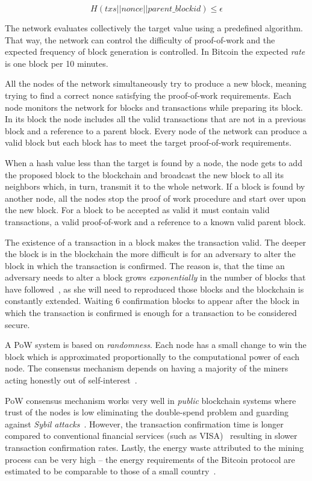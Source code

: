 \begin{equation*}
  H(txs || nonce || parent\_blockid) \leq \epsilon
\end{equation*}

The network evaluates collectively the target value using a predefined algorithm. That way, the network can control the difficulty of proof-of-work and the expected frequency of block generation is controlled. In Bitcoin the expected \textit{rate} is one block per 10 minutes.

All the nodes of the network simultaneously try to produce a new block, meaning trying to find a correct nonce satisfying the proof-of-work requirements. Each node monitors the network for blocks and transactions while preparing its block. In its block the node includes all the valid transactions that are not in a previous block and a reference to a parent block. Every node of the network can produce a valid block but each block has to meet the target proof-of-work requirements.

When a hash value less than the target is found by a node, the node gets to add the proposed block to the blockchain and broadcast the new block to all its neighbors which, in turn, transmit it to the whole network. If a block is found by another node, all the nodes stop the proof of work procedure and start over upon the new block. For a block to be accepted as valid it must contain valid transactions, a valid proof-of-work and a reference to a known valid parent block.

The existence of a transaction in a block makes the transaction valid. The deeper the block is in the blockchain the more difficult is for an adversary to alter the block in which the transaction is confirmed. The reason is, that the time an adversary needs to alter a block grows \textit{exponentially} in the number of blocks that have followed~\cite{10.1007/978-3-662-46803-6_10}, as she will need to reproduced those blocks and the blockchain is constantly extended. Waiting 6 confirmation blocks to appear after the block in which the transaction is confirmed is enough for a transaction to be considered secure.

A PoW system is based on \textit{randomness}. Each node has a small change to win the block which is approximated proportionally to the computational power of each node. The consensus mechanism depends on having a majority of the miners acting honestly out of self-interest~\cite{antonopoulos2014mastering}.

PoW consensus mechanism works very well in \textit{public} blockchain systems where trust of the nodes is low eliminating the double-spend problem and guarding against \textit{Sybil attacks}~\cite{sybil_attack}. However, the transaction confirmation time is longer compared to conventional financial services (such as VISA)~\cite{Sompolinsky2015,Zohar:2015:BUH:2817191.2701411,DBLP:journals/corr/abs-1708-05665} resulting in slower transaction confirmation rates. Lastly, the energy waste attributed to the mining process can be very high -- the energy requirements of the Bitcoin protocol are estimated to be comparable to those of a small country~\cite{6912770}.

